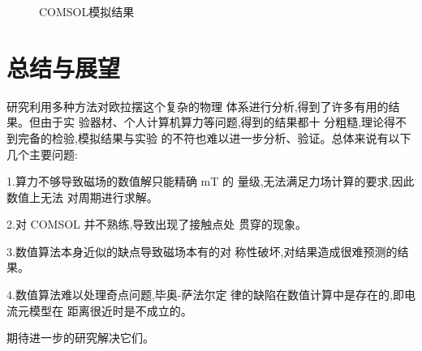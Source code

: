 \documentclass[AutoFakeBold]{LZUThesis}
\begin{document}
\begin{figure}[H]
    \centering
    \caption{COMSOL模拟结果}
    \label{COMSOL结果}
\end{figure}

\chapter{总结与展望}
研究利用多种方法对欧拉摆这个复杂的物理
体系进行分析,得到了许多有用的结果。但由于实
验器材、个人计算机算力等问题,得到的结果都十
分粗糙,理论得不到完备的检验,模拟结果与实验
的不符也难以进一步分析、验证。总体来说有以下
几个主要问题:

1.算力不够导致磁场的数值解只能精确 mT 的
量级,无法满足力场计算的要求,因此数值上无法
对周期进行求解。

2.对 COMSOL 并不熟练,导致出现了接触点处
贯穿的现象。

3.数值算法本身近似的缺点导致磁场本有的对
称性破坏,对结果造成很难预测的结果。

4.数值算法难以处理奇点问题,毕奥-萨法尔定
律的缺陷在数值计算中是存在的,即电流元模型在
距离很近时是不成立的。

期待进一步的研究解决它们。
\backmatter


\printbib
\end{document}
